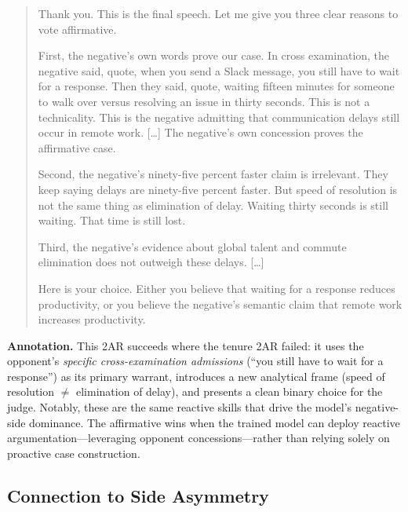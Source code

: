 \begin{quote}
\small
Thank you. This is the final speech. Let me give you three clear reasons
to vote affirmative.

First, the negative's own words prove our case. In cross examination, the
negative said, quote, when you send a Slack message, you still have to wait
for a response. Then they said, quote, waiting fifteen minutes for someone
to walk over versus resolving an issue in thirty seconds. This is not a
technicality. This is the negative admitting that communication delays still
occur in remote work. [\ldots] The negative's own concession proves the
affirmative case.

Second, the negative's ninety-five percent faster claim is irrelevant. They
keep saying delays are ninety-five percent faster. But speed of resolution
is not the same thing as elimination of delay. Waiting thirty seconds is
still waiting. That time is still lost.

Third, the negative's evidence about global talent and commute elimination
does not outweigh these delays. [\ldots]

Here is your choice. Either you believe that waiting for a response reduces
productivity, or you believe the negative's semantic claim that remote work
increases productivity.
\end{quote}

\noindent\textbf{Annotation.}
This 2AR succeeds where the tenure 2AR failed: it uses the opponent's
\emph{specific cross-examination admissions} (``you still have to wait for
a response'') as its primary warrant, introduces a new analytical frame
(speed of resolution $\neq$ elimination of delay), and presents a clean
binary choice for the judge. Notably, these are the same reactive skills
that drive the model's negative-side dominance. The affirmative wins
when the trained model can deploy reactive argumentation---leveraging
opponent concessions---rather than relying solely on proactive case
construction.

\subsection{Connection to Side Asymmetry}

